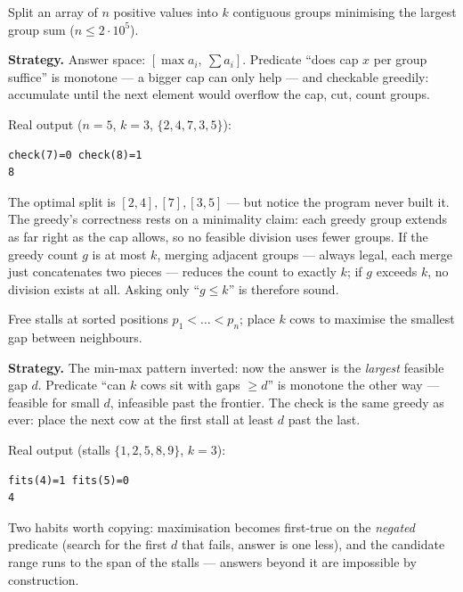 \begin{example}\label{ex:arrdiv}
Split an array of $n$ positive values into $k$ contiguous groups
minimising the largest group sum ($n \le 2\cdot10^5$).
\par\smallskip
\textbf{Strategy.} Answer space: $[\max a_i,\ \sum a_i]$. Predicate
``does cap $x$ per group suffice'' is monotone --- a bigger cap can only
help --- and checkable greedily: accumulate until the next element would
overflow the cap, cut, count groups.
\par\smallskip
\begin{solution}

Real output ($n{=}5$, $k{=}3$, $\{2,4,7,3,5\}$):
\begin{lstlisting}[numbers=none]
check(7)=0 check(8)=1
8
\end{lstlisting}
The optimal split is $[2,4],[7],[3,5]$ --- but notice the program never
built it. The greedy's correctness rests on a minimality claim: each
greedy group extends as far right as the cap allows, so no feasible
division uses fewer groups. If the greedy count $g$ is at most $k$,
merging adjacent groups --- always legal, each merge just concatenates
two pieces --- reduces the count to exactly $k$; if $g$ exceeds $k$, no
division exists at all. Asking only ``$g \le k$'' is therefore sound.
\end{solution}
\end{example}

\begin{example}\label{ex:social}
Free stalls at sorted positions $p_1 < \dots < p_n$; place $k$ cows to
maximise the smallest gap between neighbours.
\par\smallskip
\textbf{Strategy.} The min-max pattern inverted: now the answer is the
\emph{largest} feasible gap $d$. Predicate ``can $k$ cows sit with gaps
$\ge d$'' is monotone the other way --- feasible for small $d$, infeasible
past the frontier. The check is the same greedy as ever: place the next
cow at the first stall at least $d$ past the last.
\par\smallskip
\begin{solution}

Real output (stalls $\{1,2,5,8,9\}$, $k=3$):
\begin{lstlisting}[numbers=none]
fits(4)=1 fits(5)=0
4
\end{lstlisting}
Two habits worth copying: maximisation becomes first-true on the
\emph{negated} predicate (search for the first $d$ that fails, answer is
one less), and the candidate range runs to the span of the stalls ---
answers beyond it are impossible by construction.
\end{solution}
\end{example}

